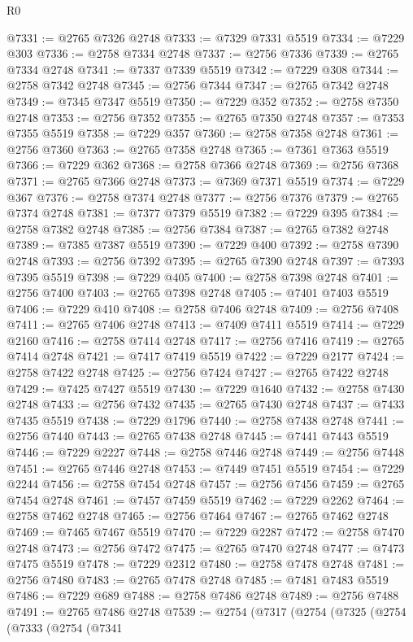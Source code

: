 \begin{lexlean}{R0}
\begin{coremodule}
@7331 := @2765 @7326 @2748
@7333 := @7329 @7331 @5519
@7334 := @7229 @303
@7336 := @2758 @7334 @2748
@7337 := @2756 @7336
@7339 := @2765 @7334 @2748
@7341 := @7337 @7339 @5519
@7342 := @7229 @308
@7344 := @2758 @7342 @2748
@7345 := @2756 @7344
@7347 := @2765 @7342 @2748
@7349 := @7345 @7347 @5519
@7350 := @7229 @352
@7352 := @2758 @7350 @2748
@7353 := @2756 @7352
@7355 := @2765 @7350 @2748
@7357 := @7353 @7355 @5519
@7358 := @7229 @357
@7360 := @2758 @7358 @2748
@7361 := @2756 @7360
@7363 := @2765 @7358 @2748
@7365 := @7361 @7363 @5519
@7366 := @7229 @362
@7368 := @2758 @7366 @2748
@7369 := @2756 @7368
@7371 := @2765 @7366 @2748
@7373 := @7369 @7371 @5519
@7374 := @7229 @367
@7376 := @2758 @7374 @2748
@7377 := @2756 @7376
@7379 := @2765 @7374 @2748
@7381 := @7377 @7379 @5519
@7382 := @7229 @395
@7384 := @2758 @7382 @2748
@7385 := @2756 @7384
@7387 := @2765 @7382 @2748
@7389 := @7385 @7387 @5519
@7390 := @7229 @400
@7392 := @2758 @7390 @2748
@7393 := @2756 @7392
@7395 := @2765 @7390 @2748
@7397 := @7393 @7395 @5519
@7398 := @7229 @405
@7400 := @2758 @7398 @2748
@7401 := @2756 @7400
@7403 := @2765 @7398 @2748
@7405 := @7401 @7403 @5519
@7406 := @7229 @410
@7408 := @2758 @7406 @2748
@7409 := @2756 @7408
@7411 := @2765 @7406 @2748
@7413 := @7409 @7411 @5519
@7414 := @7229 @2160
@7416 := @2758 @7414 @2748
@7417 := @2756 @7416
@7419 := @2765 @7414 @2748
@7421 := @7417 @7419 @5519
@7422 := @7229 @2177
@7424 := @2758 @7422 @2748
@7425 := @2756 @7424
@7427 := @2765 @7422 @2748
@7429 := @7425 @7427 @5519
@7430 := @7229 @1640
@7432 := @2758 @7430 @2748
@7433 := @2756 @7432
@7435 := @2765 @7430 @2748
@7437 := @7433 @7435 @5519
@7438 := @7229 @1796
@7440 := @2758 @7438 @2748
@7441 := @2756 @7440
@7443 := @2765 @7438 @2748
@7445 := @7441 @7443 @5519
@7446 := @7229 @2227
@7448 := @2758 @7446 @2748
@7449 := @2756 @7448
@7451 := @2765 @7446 @2748
@7453 := @7449 @7451 @5519
@7454 := @7229 @2244
@7456 := @2758 @7454 @2748
@7457 := @2756 @7456
@7459 := @2765 @7454 @2748
@7461 := @7457 @7459 @5519
@7462 := @7229 @2262
@7464 := @2758 @7462 @2748
@7465 := @2756 @7464
@7467 := @2765 @7462 @2748
@7469 := @7465 @7467 @5519
@7470 := @7229 @2287
@7472 := @2758 @7470 @2748
@7473 := @2756 @7472
@7475 := @2765 @7470 @2748
@7477 := @7473 @7475 @5519
@7478 := @7229 @2312
@7480 := @2758 @7478 @2748
@7481 := @2756 @7480
@7483 := @2765 @7478 @2748
@7485 := @7481 @7483 @5519
@7486 := @7229 @689
@7488 := @2758 @7486 @2748
@7489 := @2756 @7488
@7491 := @2765 @7486 @2748
@7539 := @2754
    (@7317
      (@2754
        (@7325
          (@2754
            (@7333
              (@2754
                (@7341

\end{coremodule}
\end{lexlean}
